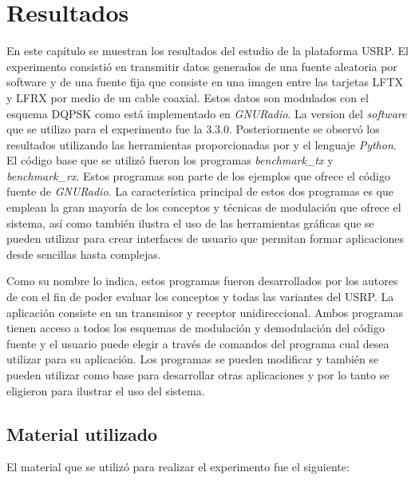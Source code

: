 \chapter{Resultados}
\label{ch:resultados}

En este cap\'itulo se muestran los resultados del estudio de la plataforma USRP. El experimento
consisti\'o en transmitir datos generados de una fuente aleatoria por software y de una fuente fija
que consiste en una imagen entre las tarjetas LFTX y LFRX por medio de un cable coaxial. Estos
datos son modulados con el esquema DQPSK como est\'a implementado en \emph{GNURadio}. La version del \emph{software} que se utilizo para el experimento fue la 3.3.0.
Posteriormente se observ\'o los resultados utilizando las herramientas proporcionadas por \gnuradio y el lenguaje \emph{Python}. El c\'odigo base
que se utiliz\'o fueron los programas \emph{benchmark\_tx} y \emph{benchmark\_rx}. Estos programas son parte de los ejemplos que ofrece
el c\'odigo fuente de \emph{GNURadio}. La caracter\'istica principal de estos dos programas es que emplean la gran mayor\'ia de
los conceptos y t\'ecnicas de modulaci\'on que ofrece el sistema, as\'i como tambi\'en ilustra el uso de las herramientas
gr\'aficas que se pueden utilizar para crear interfaces de usuario que permitan formar aplicaciones desde sencillas hasta complejas.

Como su nombre lo indica, estos programas fueron desarrollados por los autores de \gnuradio con el fin de poder evaluar los
conceptos y todas las variantes del USRP. La aplicaci\'on consiste en un transmisor y receptor unidireccional. Ambos programas
tienen acceso a todos los esquemas de modulaci\'on y demodulaci\'on del c\'odigo fuente y el usuario puede elegir a trav\'es de
comandos del programa cual desea utilizar para su aplicaci\'on. Los programas se pueden modificar y tambi\'en se pueden utilizar
como base para desarrollar otras aplicaciones y por lo tanto se eligieron para ilustrar el uso del sistema. 

\section{Material utilizado}
El material que se utiliz\'o para realizar el experimento fue el siguiente:

